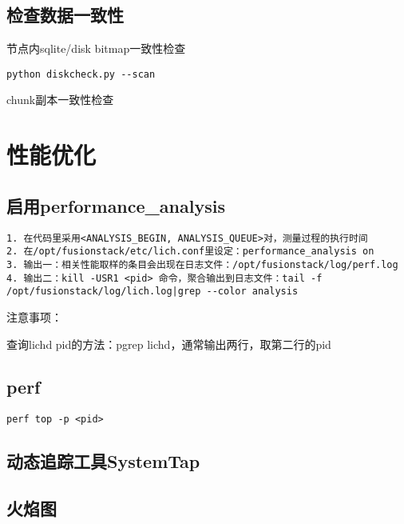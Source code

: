 
\subsection{检查数据一致性}

节点内sqlite/disk bitmap一致性检查

\begin{lstlisting}
python diskcheck.py --scan
\end{lstlisting}

chunk副本一致性检查

\section{性能优化}

\subsection{启用performance\_analysis}

\begin{lstlisting}
1. 在代码里采用<ANALYSIS_BEGIN, ANALYSIS_QUEUE>对，测量过程的执行时间
2. 在/opt/fusionstack/etc/lich.conf里设定：performance_analysis on
3. 输出一：相关性能取样的条目会出现在日志文件：/opt/fusionstack/log/perf.log
4. 输出二：kill -USR1 <pid> 命令，聚合输出到日志文件：tail -f /opt/fusionstack/log/lich.log|grep --color analysis
\end{lstlisting}

注意事项：
\begin{compactenum}
\item 查询lichd pid的方法：pgrep lichd，通常输出两行，取第二行的pid
\end{compactenum}

\subsection{perf}

\begin{lstlisting}
perf top -p <pid> 
\end{lstlisting}

\subsection{动态追踪工具SystemTap}



\subsection{火焰图}
